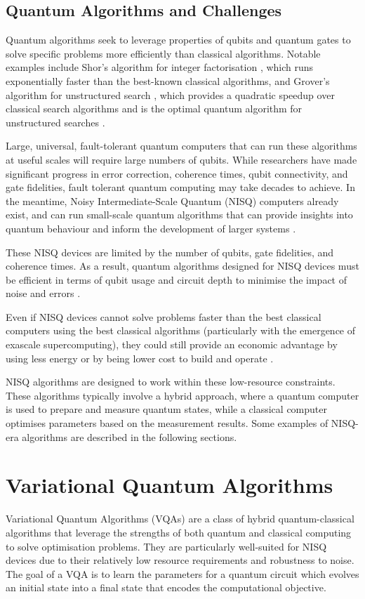 \subsection{Quantum Algorithms and Challenges}

Quantum algorithms seek to leverage properties of qubits and quantum gates to solve specific problems more efficiently than classical algorithms. Notable examples include Shor's algorithm for integer factorisation \cite{Shor_algorithm}, which runs exponentially faster than the best-known classical algorithms, and Grover's algorithm for unstructured search \cite{grover_search}, which provides a quadratic speedup over classical search algorithms and is the optimal quantum algorithm for unstructured searches \cite{grover_optimal}.

Large, universal, fault-tolerant quantum computers that can run these algorithms at useful scales will require large numbers of qubits. While researchers have made significant progress in error correction, coherence times, qubit connectivity, and gate fidelities, fault tolerant quantum computing may take decades to achieve. In the meantime, Noisy Intermediate-Scale Quantum (NISQ) computers already exist, and can run small-scale quantum algorithms that can provide insights into quantum behaviour and inform the development of larger systems \cite{NISQ_era}.

These NISQ devices are limited by the number of qubits, gate fidelities, and coherence times. As a result, quantum algorithms designed for NISQ devices must be efficient in terms of qubit usage and circuit depth to minimise the impact of noise and errors \cite{NISQ_era}. 

Even if NISQ devices cannot solve problems faster than the best classical computers using the best classical algorithms (particularly with the emergence of exascale supercomputing), they could still provide an economic advantage by using less energy or by being lower cost to build and operate \cite{NISQ_era}.

NISQ algorithms are designed to work within these low-resource constraints. These algorithms typically involve a hybrid approach, where a quantum computer is used to prepare and measure quantum states, while a classical computer optimises parameters based on the measurement results. Some examples of NISQ-era algorithms are described in the following sections.

\section{Variational Quantum Algorithms}
Variational Quantum Algorithms (VQAs) are a class of hybrid quantum-classical algorithms that leverage the strengths of both quantum and classical computing to solve optimisation problems. They are particularly well-suited for NISQ devices due to their relatively low resource requirements and robustness to noise. The goal of a VQA is to learn the parameters for a quantum circuit which evolves an initial state into a final state that encodes the computational objective.

